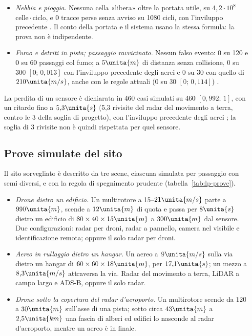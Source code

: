 \begin{itemize}
\item \emph{Nebbia e pioggia.} Nessuna cella «libera» oltre la portata utile, su $4{,}2\cdot10^8$ celle\,$\cdot$\,ciclo, e 0 tracce perse senza avviso su 1080 cicli, con l'inviluppo precedente . Il conto della portata e il sistema usano la stessa formula: la prova non è indipendente.
\item \emph{Fumo e detriti in pista; passaggio ravvicinato.} Nessun falso evento: 0 su 120 e 0 su 60 passaggi col fumo; a $5\unita{m}$ di distanza senza collisione, 0 su 300 $[0;\,0{,}013]$ con l'inviluppo precedente degli aerei e 0 su 30 con quello di $210\unita{m/s}$, anche con le regole attuali (0 su 30 $[0;\,0{,}114]$) .
\end{itemize}
La perdita di un sensore è dichiarata in 460 casi simulati su 460 $[0{,}992;\,1]$, con un ritardo fino a $5{,}3\unita{s}$ (5,3 rivisite del radar del movimento a terra, contro le 3 della soglia di progetto), con l'inviluppo precedente degli aerei ; la soglia di 3 rivisite non è quindi rispettata per quel sensore.

\subsection{Prove simulate del sito}\label{sec:lp-prove}

Il sito sorvegliato è descritto da tre scene, ciascuna simulata per passaggio con semi diversi, e con la regola di spegnimento prudente (tabella~\ref{tab:lp-prove}).
\begin{itemize}
\item \emph{Drone dietro un edificio.} Un multirotore a 15--$21\unita{m/s}$ parte a $990\unita{m}$, scende a $12\unita{m}$ di quota e passa per $8\unita{s}$ dietro un edificio di $80\times40\times15\unita{m}$ a $300\unita{m}$ dal sensore. Due configurazioni: radar per droni, radar a pannello, camera nel visibile e identificazione remota; oppure il solo radar per droni.
\item \emph{Aereo in rullaggio dietro un hangar.} Un aereo a $9\unita{m/s}$ sulla via dietro un hangar di $60\times60\times18\unita{m}$, per $17{,}1\unita{s}$; un mezzo a $8{,}3\unita{m/s}$ attraversa la via. Radar del movimento a terra, LiDAR a campo largo e ADS-B, oppure il solo radar.
\item \emph{Drone sotto la copertura del radar d'aeroporto.} Un multirotore scende da $120$ a $30\unita{m}$ sull'asse di una pista; sotto circa $43\unita{m}$ a $2{,}5\unita{km}$ una fascia di alberi ed edifici lo nasconde al radar d'aeroporto, mentre un aereo è in finale.
\end{itemize}

